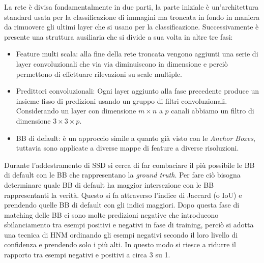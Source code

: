 La rete è divisa fondamentalmente in due parti, la parte iniziale è un'architettura standard usata per la classificazione di immagini ma troncata in fondo in maniera da rimuovere gli ultimi layer che si usano per la classificazione. Successivamente è presente una struttura ausiliaria che si divide a sua volta in altre tre fasi:
\begin{itemize}
    \item Feature multi scala: alla fine della rete troncata vengono aggiunti una serie di layer convoluzionali che via via diminuiscono in dimensione e perciò permettono di effettuare rilevazioni su scale multiple. 
    \item Predittori convoluzionali: Ogni layer aggiunto alla fase precedente produce un insieme fisso di predizioni usando un gruppo di filtri convoluzionali. Considerando un layer con dimensione $m \times n$ a $p$ canali abbiamo un filtro di dimensione $3 \times 3 \times p$.
    \item \ac{BB} di default: è un approccio simile a quanto già visto con le \textit{Anchor Boxes}, tuttavia sono applicate a diverse mappe di feature a diverse risoluzioni. 
\end{itemize}
Durante l'addestramento di \ac{SSD} si cerca di far combaciare il più possibile le \ac{BB} di default con le \ac{BB} che rappresentano la \textit{ground truth}. Per fare ciò bisogna determinare quale \ac{BB} di default ha maggior intersezione con le \ac{BB} rappresentanti la verità. Questo si fa attraverso l'indice di Jaccard (o \ac{IoU}) e prendendo quelle \ac{BB} di default con gli indici maggiori. 
Dopo questa fase di matching delle \ac{BB} ci sono molte predizioni negative che introducono sbilanciamento tra esempi positivi e negativi in fase di training, perciò si adotta una tecnica di \ac{HNM} ordinando gli esempi negativi secondo il loro livello di confidenza e prendendo solo i più alti. In questo modo si riesce a ridurre il rapporto tra esempi negativi e positivi a circa 3 su 1.

